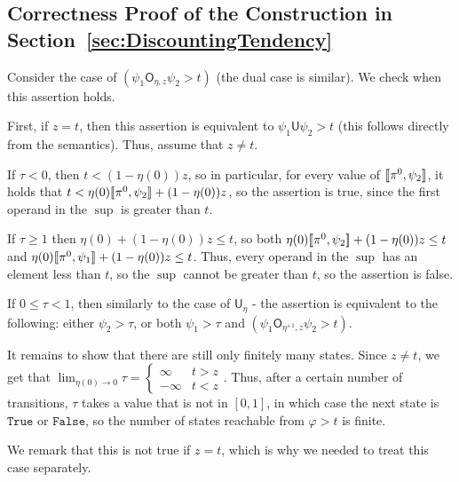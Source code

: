 \documentclass{llncs}
\newcommand{\True}{\mathtt{True}}
\newcommand{\False}{\mathtt{False}}
\newcommand{\Until}{\mathsf{U}}
\newcommand{\parUntil}{\mathsf{O}}
\renewcommand{\phi}{\varphi}
\newcommand{\df}{\eta}
\begin{document}
\subsection{Correctness Proof of the Construction in Section~\ref{sec:DiscountingTendency}}
\label{apx:disc tendency proof}
Consider the case of $(\psi_1\parUntil_{\df,z} \psi_2>t)$ (the dual case is similar). We check when this assertion holds.

First, if $z=t$, then this assertion is equivalent to $\psi_1\Until\psi_2>t$ (this follows directly from the semantics).
Thus, assume that $z\neq t$.

If $\tau<0$, then $t<(1-\df(0))z$, so in particular, for every value of $[\![\pi^0,\psi_2]\!]$, it holds that $t<\df(0)\sem{\pi^0,\psi_2}+(1-\df(0))z$, so the assertion is true, since the first operand in the $\sup$ is greater than $t$.

If $\tau\ge 1$ then $\df(0)+(1-\df(0))z\le t$, so both
$\df(0)\sem{\pi^0,\psi_2}+(1-\df(0))z\le t$ and $\df(0)\sem{\pi^0,\psi_1}+(1-\df(0))z\le t$. Thus, every operand in the $\sup$ has an element less than $t$, so the $\sup$ cannot be greater than $t$, so the assertion is false.

If $0\le \tau<1$, then similarly to the case of $\Until_\df$ - the assertion is equivalent to the following: either $\psi_2>\tau$, or both $\psi_1>\tau$ and $(\psi_1\parUntil_{\df^{+1},z} \psi_2>t)$.


It remains to show that there are still only finitely many states. Since $z\neq t$, we get that $\lim_{\df(0)\to 0}\tau=\begin{cases}
\infty & t>z\\
-\infty & t<z
\end{cases}.$
Thus, after a certain number of transitions, $\tau$ takes a value that is not in $[0,1]$, in which case the next state is $\True$ or $\False$, so the number of states reachable from $\phi>t$ is finite.

We remark that this is not true if $z=t$, which is why we needed to treat this case separately.
\end{document}
